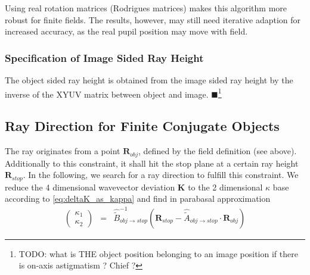 \documentclass[12pt,a4paper,twoside,openright,BCOR10mm,headsepline,titlepage,abstracton,chapterprefix,final]{scrreprt}
\newcommand\Vector[1]{{\mathbf{#1}}}
\newcommand{\remark}[1]{{\color{red}$\blacksquare$}\footnote{{\color{red}#1}}}
\begin{document}
Using real rotation matrices (Rodrigues matrices) makes this algorithm more robust for finite fields.
The results, however, may still need iterative adaption for increased accuracy, as the real pupil position may move with field.

\subsubsection{Specification of Image Sided Ray Height}
The object sided ray height is obtained from the image sided ray height by the inverse of the XYUV matrix between object and image.
\remark{TODO: what is THE object position belonging to an image position if there is on-axis astigmatism ? Chief ?}



\subsection{Ray Direction for Finite Conjugate Objects}
The ray originates from a point $\Vector{R}_{obj}$, defined by the field definition (see above).
Additionally to this constraint, it shall hit the stop plane at a certain ray height $\Vector{R}_{stop}$.
In the following, we search for a ray direction to fulfill this constraint.
We reduce the 4 dimensional wavevector deviation $\Vector{K}$ to the 2 dimensional $\kappa$ base according to \eqref{eq:deltaK_as_kappa}
and find in parabasal approximation
\begin{eqnarray}
 \begin{pmatrix}\kappa_1 \\ \kappa_2\end{pmatrix}
 &=&
 \hat{\tilde{B}}_{obj\rightarrow stop}^{-1}
 \left(
    \Vector{R}_{stop} - \hat{\tilde{A}}_{obj\rightarrow stop} \cdot \Vector{R}_{obj} 
 \right) 
\end{eqnarray}
\end{document}
